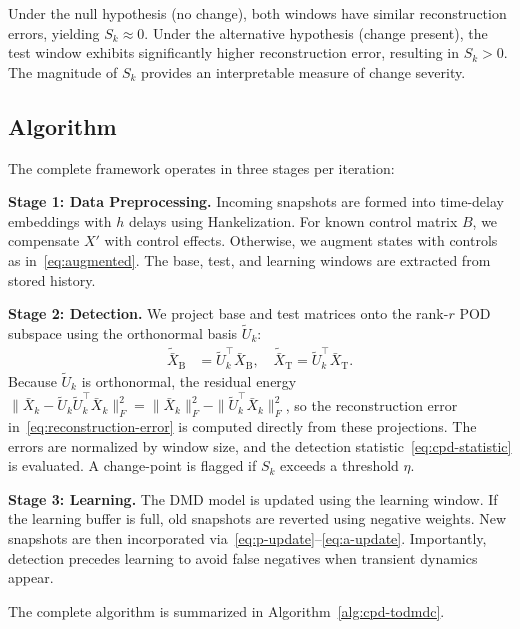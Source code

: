 \documentclass[conference]{IEEEtran}
\newcommand{\ui}[2]{#1_{\mathrm{#2}}}
\begin{document}
Under the null hypothesis (no change), both windows have similar reconstruction errors, yielding \(S_k \approx 0\). Under the alternative hypothesis (change present), the test window exhibits significantly higher reconstruction error, resulting in \(S_k > 0\). The magnitude of \(S_k\) provides an interpretable measure of change severity.

\subsection{Algorithm}

The complete framework operates in three stages per iteration:

\textbf{Stage 1: Data Preprocessing.} Incoming snapshots are formed into time-delay embeddings with \(h\) delays using Hankelization. For known control matrix \(B\), we compensate \(X'\) with control effects. Otherwise, we augment states with controls as in~\eqref{eq:augmented}. The base, test, and learning windows are extracted from stored history.

\textbf{Stage 2: Detection.} We project base and test matrices onto the rank-\(r\) POD subspace using the orthonormal basis \(\tilde{U}_k\):
\begin{align}
    \ui{\tilde{\bar{X}}}{B} & = \tilde{U}_k^\top \ui{\bar{X}}{B}, \quad \ui{\tilde{\bar{X}}}{T} = \tilde{U}_k^\top \ui{\bar{X}}{T}.
\end{align}
Because \(\tilde{U}_k\) is orthonormal, the residual energy \(\|\bar{X}_k - \tilde{U}_k \tilde{U}_k^\top \bar{X}_k\|_F^2 = \|\bar{X}_k\|_F^2 - \|\tilde{U}_k^\top \bar{X}_k\|_F^2\), so the reconstruction error in~\eqref{eq:reconstruction-error} is computed directly from these projections. The errors are normalized by window size, and the detection statistic~\eqref{eq:cpd-statistic} is evaluated. A change-point is flagged if \(S_k\) exceeds a threshold \(\eta\).

\textbf{Stage 3: Learning.} The DMD model is updated using the learning window. If the learning buffer is full, old snapshots are reverted using negative weights. New snapshots are then incorporated via~\eqref{eq:p-update}--\eqref{eq:a-update}. Importantly, detection precedes learning to avoid false negatives when transient dynamics appear.

The complete algorithm is summarized in Algorithm~\ref{alg:cpd-todmdc}.
\end{document}
